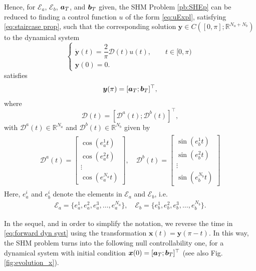 \documentclass[9pt,shortpaper,twoside,web]{ieeecolor}
\begin{document}
Hence, for $\mathcal{E}_a$, $\mathcal{E}_b$, $\bm{a}_T$, and $\bm{b}_T$ given, the SHM Problem \ref{pb:SHEp} can be reduced to finding a control function $u$ of the form \eqref{eq:uExpl}, satisfying \eqref{eq:staircase prop}, such that the corresponding solution $\bm{y} \in C([0,\pi]; \mathbb{R}^{N_a+N_b})$ to the dynamical system
\begin{equation}\label{eq:forward dyn syst}
	\begin{cases}
		\dot{\bm{y}}(t) = \dfrac{2}{\pi} \bm{\mathcal{D}}(t) u(t), \qquad  t\in [0,\pi)
		\\[5pt]
		\bm{y}(0) = 0.
	\end{cases}
\end{equation}
satisfies
\begin{align*}
	\bm{y} (\pi) = [\bm{a}_T;\bm{b}_T]^\top,	
\end{align*}
where
\begin{equation}\label{eq:Dynamics}
	\bm{\mathcal{D}}(t) = \left[ \bm{\mathcal{D}}^a(t); \bm{\mathcal{D}}^b(t) \right]^\top, 
\end{equation}
with $\bm{\mathcal{D}}^a(t) \in \mathbb{R}^{N_a} $ and $ \bm{\mathcal{D}}^b(t) \in \mathbb{R}^{N_b}$ given by
\begin{gather}\label{eq:DalphaDbeta}
	\begin{align}
		\bm{\mathcal{D}}^a(t) = 
		\begin{bmatrix} 
			\cos(e_a^1t) \\ \cos(e_a^2t) \\ \vdots \\ \cos(e_a^{N_a}t) 
		\end{bmatrix},
		\quad \bm{\mathcal{D}}^b(t) = 
		\begin{bmatrix} 
			\sin(e_b^1t) \\ \sin(e_b^2t) \\ \vdots \\ \sin(e_b^{N_b}t)
		\end{bmatrix} 
	\end{align} 
\end{gather}
Here, $e_a^i$ and $e_b^i$  denote the elements in $\mathcal{E}_a$ and  $\mathcal{E}_b$, i.e.
\begin{align*}
	\mathcal{E}_a = \{e_a^1,e_a^2,e_a^3,\dots,e_a^{N_a}\}, \quad \mathcal{E}_b = \{e_b^1,e_b^2,e_b^3,\dots,e_b^{N_b}\}.
\end{align*}

In the sequel, and in order to simplify the notation, we reverse the time in \eqref{eq:forward dyn syst} using the transformation $\bm{x} (t) = \bm{y}(\pi - t)$. In this way, the SHM problem turns into the following null controllability one, for a dynamical system with initial condition $\bm{x}(0) = [\bm{a}_T; \bm{b}_T]^\top$ (see also Fig. \ref{fig:evolution_x}).
\end{document}
